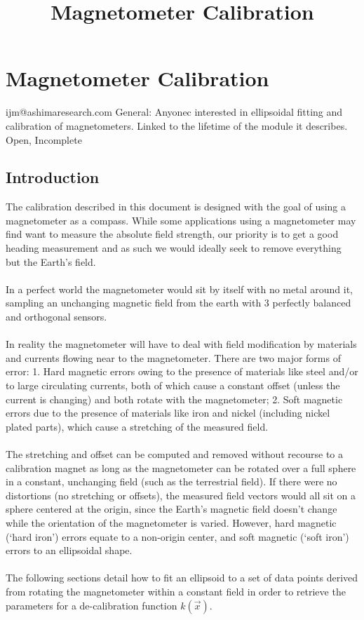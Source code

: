 \documentclass{article}
\begin{document}
\title{Magnetometer Calibration}
\section{Magnetometer Calibration}
{ijm@ashimaresearch.com}
{General: Anyonec interested in ellipsoidal fitting and calibration of magnetometers.}
{Linked to the lifetime of the module it describes.}
{Open, Incomplete}
\subsection{Introduction}
The calibration described in this document is designed with the goal of using
a magnetometer as a compass. While some applications using a magnetometer
may find want to measure the absolute field strength, our priority is to get a good
heading measurement and as such we would ideally seek to remove everything 
but the Earth's field.
\\
\\
In a perfect world the magnetometer would sit by itself with no
metal around it, sampling an unchanging magnetic field from the
earth with 3 perfectly balanced and orthogonal sensors.
\\
\\
In reality the magnetometer will have to deal with field modification by materials
and currents flowing near to the magnetometer. There are two major forms of error: 
1. Hard magnetic errors owing to the presence of materials like steel and/or to 
large circulating currents, both of which cause a constant offset (unless the current
is changing) and both rotate with the magnetometer; 2. Soft magnetic errors due to
the presence of materials like iron and nickel (including nickel plated parts), which
cause a stretching of the measured field.
\\
\\
The stretching and offset can be computed and removed without
recourse to a calibration magnet as long as the magnetometer can
be rotated over a full sphere in a constant, unchanging field (such as the
terrestrial field). If
there were no distortions (no stretching or offsets), the measured field vectors would all sit on a sphere
centered at the origin, since the Earth's magnetic field doesn't change while the
orientation of the magnetometer is varied. However, hard magnetic (`hard iron') errors equate 
to a non-origin center, and soft magnetic (`soft iron') errors to an ellipsoidal shape.
\\
\\
The following sections detail how to fit an ellipsoid to a set of
data points derived from rotating the magnetometer within a constant field in 
order to retrieve the parameters for a
de-calibration function $k(\vec{x})$.\\
\end{document}
